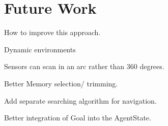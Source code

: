 

\chapter{Future Work}
How to improve this approach.

Dynamic environments


Sensors can scan in an arc rather than 360 degrees.


Better Memory selection/ trimming.


Add separate searching algorithm for navigation.


Better integration of Goal into the AgentState.
